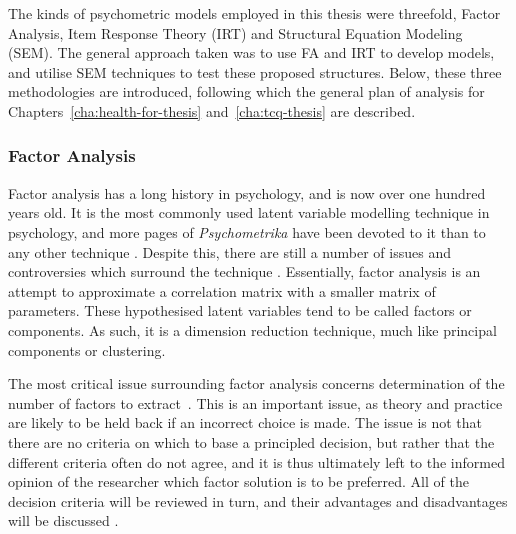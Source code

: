 The kinds of psychometric models employed in this thesis were threefold, Factor Analysis, Item Response Theory (IRT) and Structural Equation Modeling (SEM). The general approach taken was to use FA and IRT to develop models, and utilise SEM techniques to test these proposed structures. Below, these three methodologies are introduced, following which the general plan of analysis for Chapters~\ref{cha:health-for-thesis} and~\ref{cha:tcq-thesis} are described. 

\subsubsection{Factor Analysis}
\label{sec:factor-analysis}
Factor analysis has a long history in psychology, and is now over one hundred years old. It is the most commonly used latent variable modelling technique in psychology, and more pages of \textit{Psychometrika} have been devoted to it than to any other technique \cite{henson2006use}.  Despite this, there are still a number of issues and controversies which surround the technique \cite{sass2010comparative}.  Essentially, factor analysis is an attempt to approximate a correlation matrix with a smaller matrix of parameters.  These hypothesised latent variables tend to be called factors or components. As such, it is a dimension reduction technique, much like principal components or clustering. 



The most critical issue surrounding factor analysis concerns determination of the number of factors to extract~\cite{zwick1986comparison}.  This is an important issue, as theory and practice are likely to be held back if an incorrect choice is made.  The issue is not that there are no criteria on which to base a principled decision, but rather that the different criteria often do not agree, and it is thus ultimately left to the informed opinion of the researcher which factor solution is to be preferred.  All of the decision criteria will be reviewed in turn, and their advantages and disadvantages will be discussed \cite{henson2006use}. 

